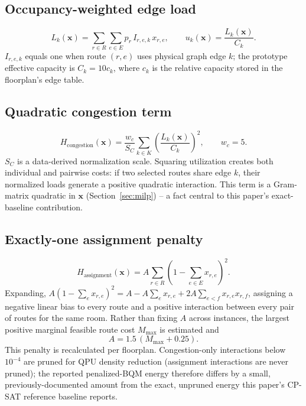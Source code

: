\documentclass[11pt]{article}
\begin{document}
\subsection{Occupancy-weighted edge load}
\begin{equation}
L_k(\mathbf{x}) = \sum_{r \in R}\sum_{e \in E} p_r\, I_{r,e,k}\, x_{r,e}, \qquad u_k(\mathbf{x}) = \frac{L_k(\mathbf{x})}{C_k}. \tag{4}
\end{equation}
$I_{r,e,k}$ equals one when route $(r,e)$ uses physical graph edge $k$; the prototype effective capacity is $C_k = 10 c_k$, where $c_k$ is the relative capacity stored in the floorplan's edge table.

\subsection{Quadratic congestion term}
\begin{equation}
H_{\text{congestion}}(\mathbf{x}) = \frac{w_c}{S_C}\sum_{k \in K}\left(\frac{L_k(\mathbf{x})}{C_k}\right)^2, \qquad w_c = 5. \tag{5}
\end{equation}
$S_C$ is a data-derived normalization scale. Squaring utilization creates both individual and pairwise costs: if two selected routes share edge $k$, their normalized loads generate a positive quadratic interaction. This term is a Gram-matrix quadratic in $\mathbf{x}$ (Section~\ref{sec:milp}) -- a fact central to this paper's exact-baseline contribution.

\subsection{Exactly-one assignment penalty}
\begin{equation}
H_{\text{assignment}}(\mathbf{x}) = A \sum_{r \in R}\left(1 - \sum_{e \in E} x_{r,e}\right)^2. \tag{6}
\end{equation}
Expanding, $A(1-\sum_e x_{r,e})^2 = A - A\sum_e x_{r,e} + 2A\sum_{e<f} x_{r,e}x_{r,f}$, assigning a negative linear bias to every route and a positive interaction between every pair of routes for the same room. Rather than fixing $A$ across instances, the largest positive marginal feasible route cost $M_{\max}$ is estimated and
\begin{equation}
A = 1.5\,(M_{\max} + 0.25). \tag{7}
\end{equation}
This penalty is recalculated per floorplan. Congestion-only interactions below $10^{-4}$ are pruned for QPU density reduction (assignment interactions are never pruned); the reported penalized-BQM energy therefore differs by a small, previously-documented amount from the exact, unpruned energy this paper's CP-SAT reference baseline reports.
\end{document}

